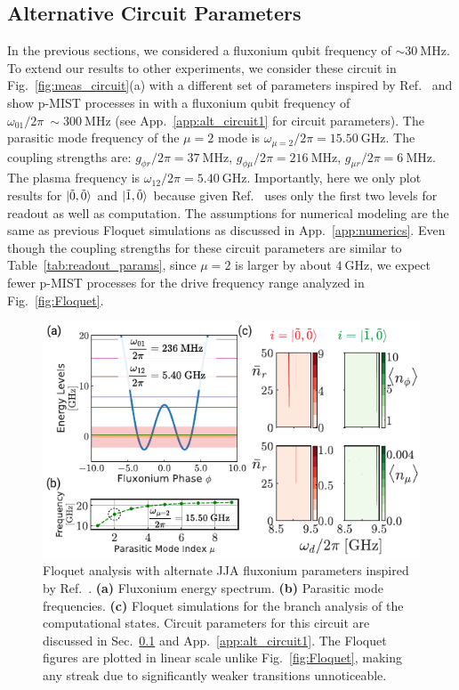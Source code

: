 \documentclass[%
reprint,
superscriptaddress,
 amsmath,amssymb,
 aps,
 prx,
longbibliography,
floatfix,
]{revtex4-2}
\begin{document}
\subsection{Alternative Circuit Parameters}\label{Will_circuit}
In the previous sections, we considered a fluxonium qubit frequency of  $\sim 30 \ \mathrm{MHz}$. To extend our results to other experiments, we consider these  circuit in Fig.~\ref{fig:meas_circuit}(a) with a different set of parameters inspired by Ref.~\cite{ding_high-fidelity_2023} and show p-MIST processes in with a fluxonium qubit frequency of $\omega_{01}/2\pi~\sim 300 \ \mathrm{MHz}$ (see App.~\ref{app:alt_circuit1} for circuit parameters). The parasitic mode frequency of the $\mu=2$ mode is $\omega_{\mu=2}/2\pi=15.50 \ \mathrm{GHz}$. The coupling strengths are:  $g_{\phi r}/2\pi=37 \ \mathrm{MHz}$, $g_{\phi\mu}/2\pi=216 \ \mathrm{MHz}$, $g_{\mu r}/2\pi=6 \ \mathrm{MHz}$. The plasma frequency is $\omega_{12}/2\pi=5.40 \ \mathrm{GHz}$. Importantly, here we only plot results for $\ket{\tilde{0},\tilde{0}}$ and $\ket{\tilde{1},\tilde{0}}$ because given Ref.~\cite{ding_high-fidelity_2023} uses only the first two levels for readout as well as computation. The assumptions for numerical modeling are the same as previous Floquet simulations as discussed in App.~\ref{app:numerics}. Even though the coupling strengths for these circuit parameters are similar to Table~\ref{tab:readout_params}, since $\mu=2$ is larger by about $4 \ \mathrm{GHz}$, we expect fewer p-MIST processes for the drive frequency range analyzed in Fig.~\ref{fig:Floquet}. 

\begin{figure}[t]
    \centering
    \includegraphics[width=\linewidth]{Figures/Floquet_Will.pdf}
    \caption{Floquet analysis with alternate JJA fluxonium parameters inspired by Ref.~\cite{ding_high-fidelity_2023}. \textbf{(a)} Fluxonium energy spectrum. \textbf{(b)} Parasitic mode frequencies. \textbf{(c)} Floquet simulations for the branch analysis of the computational states. Circuit parameters for this circuit are discussed in Sec.~\ref{Will_circuit} and App.~\ref{app:alt_circuit1}. The Floquet figures are plotted in linear scale unlike Fig.~\ref{fig:Floquet}, making any streak due to significantly weaker transitions unnoticeable.}
    \label{fig:Floquet1}
\end{figure}
\end{document}
